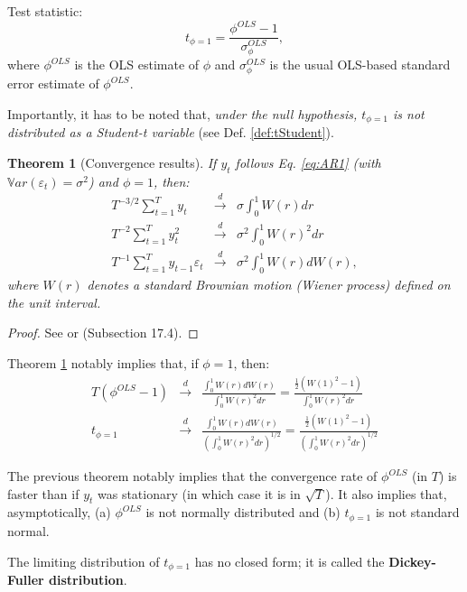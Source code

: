 \documentclass[
  11pt,
]{book}
\newtheorem{theorem}{Theorem}[chapter]
\theoremstyle{definition}
\theoremstyle{definition}
\theoremstyle{definition}
\theoremstyle{definition}
\theoremstyle{remark}
\begin{document}
Test statistic:
\[
t_{\phi=1} = \frac{\phi^{OLS}-1}{\sigma^{OLS}_{\phi}},
\]
where \(\phi^{OLS}\) is the OLS estimate of \(\phi\) and \(\sigma^{OLS}_{\phi}\) is the usual OLS-based standard error estimate of \(\phi^{OLS}\).

Importantly, it has to be noted that, \emph{under the null hypothesis, \(t_{\phi=1}\) is not distributed as a Student-t variable} (see Def. \ref{def:tStudent}).

\begin{theorem}[Convergence results]
\protect\hypertarget{thm:cvgceunitroot}{}\label{thm:cvgceunitroot}If \(y_t\) follows Eq. \eqref{eq:AR1} (with \(\mathbb{V}ar(\varepsilon_t)=\sigma^2\)) and \(\phi=1\), then:
\begin{eqnarray}
T^{-3/2} \sum_{t=1}^{T} y_{t} &\overset{d}{\rightarrow}& \sigma \int_{0}^{1}W(r)dr\\
T^{-2} \sum_{t=1}^{T} y_{t}^2 &\overset{d}{\rightarrow}& \sigma^2 \int_{0}^{1}W(r)^2dr\\
T^{-1} \sum_{t=1}^{T} y_{t-1}\varepsilon_{t} &\overset{d}{\rightarrow}& \sigma^2 \int_{0}^{1}W(r)dW(r),
\end{eqnarray}
where \(W(r)\) denotes a standard Brownian motion (Wiener process) defined on the unit interval.
\end{theorem}

\begin{proof}
See \citet{Phillips_1987} or \citet{Hamilton_1994} (Subsection 17.4).
\end{proof}

Theorem \ref{thm:cvgceunitroot} notably implies that, if \(\phi=1\), then:
\begin{eqnarray}
T(\phi^{OLS}-1) &\overset{d}{\rightarrow}& \frac{\int_{0}^{1}W(r)dW(r)}{\int_{0}^{1}W(r)^2dr} = \frac{\frac{1}{2}(W(1)^2-1)}{\int_{0}^{1}W(r)^2dr}\label{eq:biasstat}\\
t_{\phi=1} &\overset{d}{\rightarrow}& \frac{\int_{0}^{1}W(r)dW(r)}{\left(\int_{0}^{1}W(r)^2dr\right)^{1/2}}= \frac{\frac{1}{2}(W(1)^2-1)}{\left(\int_{0}^{1}W(r)^2dr\right)^{1/2}}\label{eq:tstat}
\end{eqnarray}

The previous theorem notably implies that the convergence rate of \(\phi^{OLS}\) (in \(T\)) is faster than if \(y_t\) was stationary (in which case it is in \(\sqrt{T}\)). It also implies that, asymptotically, (a) \(\phi^{OLS}\) is not normally distributed and (b) \(t_{\phi=1}\) is not standard normal.

The limiting distribution of \(t_{\phi=1}\) has no closed form; it is called the \textbf{Dickey-Fuller distribution}.
\end{document}
